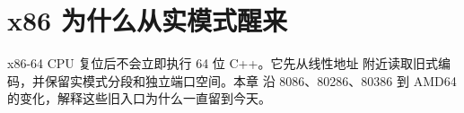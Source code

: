 \chapter{x86 为什么从实模式醒来}

x86-64 CPU 复位后不会立即执行 64 位 C++。它先从线性地址
 附近读取旧式编码，并保留实模式分段和独立端口空间。本章
沿 8086、80286、80386 到 AMD64 的变化，解释这些旧入口为什么一直留到今天。





